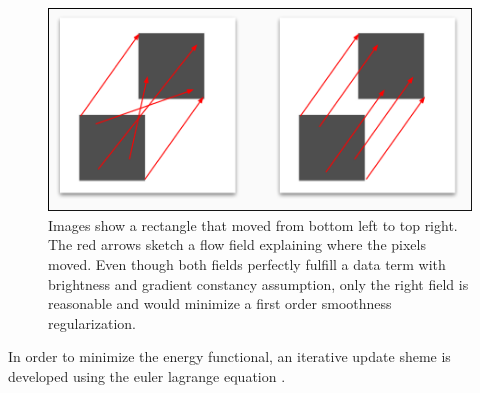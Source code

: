\documentclass[journal]{vgtc}
\begin{document}
\begin{figure}[htb]
\centering
\includegraphics[width=\linewidth]{images/ambiguousflow.png}
\caption{Images show a rectangle that moved from bottom left to top right. The red arrows sketch a flow field explaining where the pixels moved.
Even though both fields perfectly fulfill a data term with brightness and gradient constancy assumption, only the right field is reasonable and would minimize a first order smoothness regularization.}
\label{fig:ambigdataterm}
\end{figure}

In order to minimize the energy functional, an iterative update sheme is developed using the euler lagrange equation \cite{eulerlagrange}.
\end{document}
